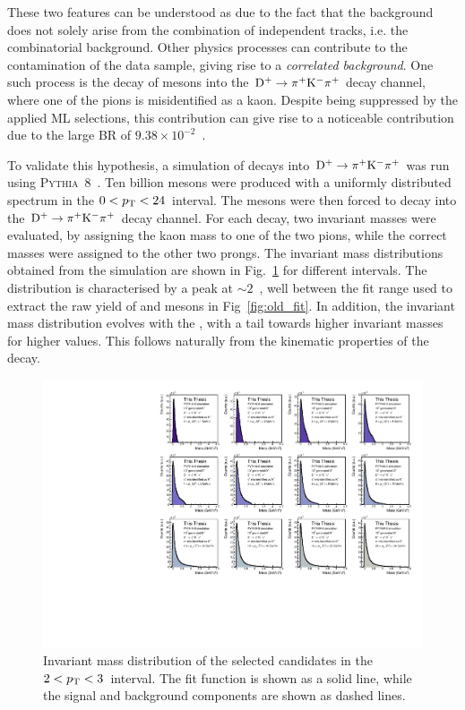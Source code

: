 These two features can be understood as due to the fact that the background does not solely arise from the combination of independent tracks, i.e. the combinatorial background. Other physics processes can contribute to the contamination of the data sample, giving rise to a \emph{correlated background}. One such process is the decay of \dpl mesons into the $\mathrm{D^+}\rightarrow\mathrm{\pi^+K^-\pi^+}$ decay channel, where one of the pions is misidentified as a kaon. Despite being suppressed by the applied ML selections, this contribution can give rise to a noticeable contribution due to the large BR of $9.38\times10^{-2}$~\cite{pdg}.

To validate this hypothesis, a simulation of \dpl decays into $\mathrm{D^+}\rightarrow\mathrm{\pi^+K^-\pi^+}$ was run using \textsc{Pythia}~8~\cite{Bierlich:2022pfr}. Ten billion \dpl mesons were produced with a uniformly distributed \pt spectrum in the $0<p_\mathrm{T}<24$~\gevc interval. The \dpl mesons were then forced to decay into the $\mathrm{D^+}\rightarrow\mathrm{\pi^+K^-\pi^+}$ decay channel. For each decay, two invariant masses were evaluated, by assigning the kaon mass to one of the two pions, while the correct masses were assigned to the other two prongs. The invariant mass distributions obtained from the simulation are shown in Fig.~\ref{fig:DplusSimulations} for different \pt intervals. The distribution is characterised by a peak at $\sim 2$~\gevcc, well between the fit range used to extract the raw yield of \ds and \dpl mesons in Fig~\ref{fig:old_fit}. In addition, the invariant mass distribution evolves with the \dpl \pt, with a tail towards higher invariant masses for higher \pt values. This follows naturally from the kinematic properties of the decay.

\begin{figure}[htb]
    \centering
    \includegraphics[width=\textwidth]{Figures/Chapter 5/Dplus_Corr_Bkg_simulation.pdf}
    \caption{Invariant mass distribution of the selected candidates in the $2<p_\mathrm{T}<3$~\gevc interval. The fit function is shown as a solid line, while the signal and background components are shown as dashed lines.}
    \label{fig:DplusSimulations}
\end{figure}

